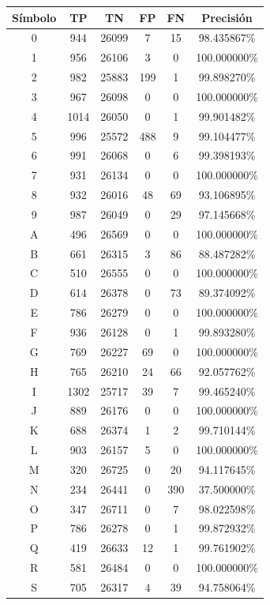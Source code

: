 \documentclass[a4paper, 11pt, oneside]{report}
\begin{document}
\begin{table}
\centering
\begin{tabular}{|c|c|c|c|c|c|}
	\hline
	Símbolo & TP & TN & FP & FN & Precisión \\ 
	\hline
	0 & 944 & 26099 & 7 & 15 & 98.435867\% \\ 
	1 & 956 & 26106 & 3 & 0 & 100.000000\% \\ 
	2 & 982 & 25883 & 199 & 1 & 99.898270\% \\ 
	3 & 967 & 26098 & 0 & 0 & 100.000000\% \\ 
	4 & 1014 & 26050 & 0 & 1 & 99.901482\% \\ 
	5 & 996 & 25572 & 488 & 9 & 99.104477\% \\ 
	6 & 991 & 26068 & 0 & 6 & 99.398193\% \\ 
	7 & 931 & 26134 & 0 & 0 & 100.000000\% \\ 
	8 & 932 & 26016 & 48 & 69 & 93.106895\% \\ 
	9 & 987 & 26049 & 0 & 29 & 97.145668\% \\ 
	A & 496 & 26569 & 0 & 0 & 100.000000\% \\ 
	B & 661 & 26315 & 3 & 86 & 88.487282\% \\ 
	C & 510 & 26555 & 0 & 0 & 100.000000\% \\ 
	D & 614 & 26378 & 0 & 73 & 89.374092\% \\ 
	E & 786 & 26279 & 0 & 0 & 100.000000\% \\ 
	F & 936 & 26128 & 0 & 1 & 99.893280\% \\ 
	G & 769 & 26227 & 69 & 0 & 100.000000\% \\ 
	H & 765 & 26210 & 24 & 66 & 92.057762\% \\ 
	I & 1302 & 25717 & 39 & 7 & 99.465240\% \\ 
	J & 889 & 26176 & 0 & 0 & 100.000000\% \\ 
	K & 688 & 26374 & 1 & 2 & 99.710144\% \\ 
	L & 903 & 26157 & 5 & 0 & 100.000000\% \\ 
	M & 320 & 26725 & 0 & 20 & 94.117645\% \\ 
	N & 234 & 26441 & 0 & 390 & 37.500000\% \\ 
	O & 347 & 26711 & 0 & 7 & 98.022598\% \\ 
	P & 786 & 26278 & 0 & 1 & 99.872932\% \\ 
	Q & 419 & 26633 & 12 & 1 & 99.761902\% \\ 
	R & 581 & 26484 & 0 & 0 & 100.000000\% \\ 
	S & 705 & 26317 & 4 & 39 & 94.758064\% \\ 

\end{tabular}
\end{table}
\end{document}
